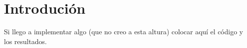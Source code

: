 \section{Introdución}
Si llego a implementar algo (que no creo a esta altura) colocar aquí el código y los resultados.

